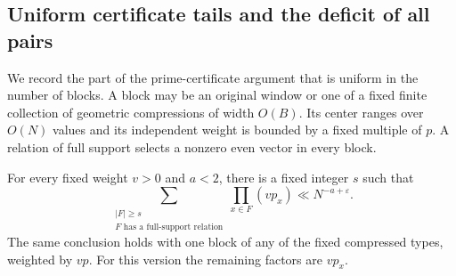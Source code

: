 \subsection{Uniform certificate tails and the deficit of all pairs}

We record the part of the prime-certificate argument that is uniform in
the number of blocks. A block may be an original window or one of a
fixed finite collection of geometric compressions of width $O(B)$.
Its center ranges over $O(N)$ values and its independent weight is
bounded by a fixed multiple of $p$. A relation of full support selects
a nonzero even vector in every block.

\begin{lemma}
\label{p13:transfer:independent-tail}
For every fixed weight $v>0$ and $a<2$, there is a fixed integer $s$
such that
\begin{equation}
 \sum_{\substack{|F|\geq s\\F\text{ has a full-support relation}}}
                  \prod_{x\in F}(vp_x)
 \ll N^{-a+\varepsilon}.
 \label{p13:transfer:tail-independent}
\end{equation}
The same conclusion holds with one block of any of the fixed compressed
types, weighted by $vp$. For this version the remaining factors are
$vp_x$.
\end{lemma}

